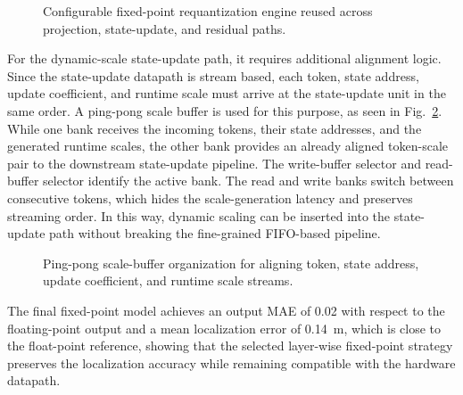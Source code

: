 \documentclass[lettersize,journal]{IEEEtran}
\begin{document}
\begin{figure}[!t]
\centering

\caption{Configurable fixed-point requantization engine reused across
projection, state-update, and residual paths.}
\label{fig:requant_engine}
\end{figure}

For the dynamic-scale state-update path, it requires additional alignment logic. Since the
state-update datapath is stream based, each token, state address, update
coefficient, and runtime scale must arrive at the state-update unit in the same
order. A ping-pong scale buffer is used for this purpose, as seen in
Fig.~\ref{fig:ping_pong}.
While one bank receives the incoming tokens, their state addresses, and the
generated runtime scales, the other bank provides an already aligned
token-scale pair to the downstream state-update pipeline. The write-buffer
selector and read-buffer selector identify the active bank. The read and write
banks switch between consecutive tokens, which hides the
scale-generation latency and preserves streaming order. In this way, dynamic
scaling can be inserted into the state-update path without breaking the
fine-grained FIFO-based pipeline.

\begin{figure}[!t]
\centering

\caption{Ping-pong scale-buffer organization for aligning token, state address,
update coefficient, and runtime scale streams.}
\label{fig:ping_pong}
\end{figure}

The final fixed-point model achieves an
output MAE of 0.02 with respect to the floating-point output and a mean
localization error of 0.14~m, which is close to the
float-point reference,
showing that the selected layer-wise fixed-point strategy preserves the
localization accuracy while remaining compatible with the hardware datapath.

\end{document}
